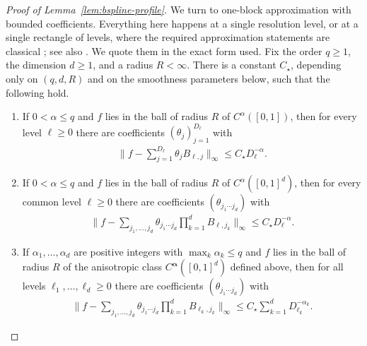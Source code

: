 \begin{proof}[Proof of Lemma~\ref{lem:bspline-profile}]
We turn to one-block approximation with bounded coefficients. Everything here happens at a single resolution level, or at a single rectangle of levels, where the required approximation statements are classical \citep[Theorem~6.10]{Schumaker2007}; see also \citet[Lemma~2 and Remark~7]{ShenGhosal2015}. We quote them in the exact form used. Fix the order $q\geq1$, the dimension $d\geq1$, and a radius $R<\infty$. There is a constant $C_\star$, depending only on $(q,d,R)$ and on the smoothness parameters below, such that the following hold.
\begin{enumerate}
\item If $0<\alpha\leq q$ and $f$ lies in the ball of radius $R$ of $C^\alpha([0,1])$, then for every level $\ell\geq0$ there are coefficients $(\theta_j)_{j=1}^{D_\ell}$ with
\begin{align*}
\Big\|f-\sum_{j=1}^{D_\ell}\theta_jB_{\ell,j}\Big\|_\infty\leq C_\star D_\ell^{-\alpha}.
\end{align*}
\item If $0<\alpha\leq q$ and $f$ lies in the ball of radius $R$ of $C^\alpha([0,1]^d)$, then for every common level $\ell\geq0$ there are coefficients $(\theta_{j_1\cdots j_d})$ with
\begin{align*}
\Big\|f-\sum_{j_1,\ldots,j_d}\theta_{j_1\cdots j_d}\prod_{k=1}^dB_{\ell,j_k}\Big\|_\infty\leq C_\star D_\ell^{-\alpha}.
\end{align*}
\item If $\alpha_1,\ldots,\alpha_d$ are positive integers with $\max_k\alpha_k\leq q$ and $f$ lies in the ball of radius $R$ of the anisotropic class $C^{\boldsymbol\alpha}([0,1]^d)$ defined above, then for all levels $\ell_1,\ldots,\ell_d\geq0$ there are coefficients $(\theta_{j_1\cdots j_d})$ with
\begin{align*}
\Big\|f-\sum_{j_1,\ldots,j_d}\theta_{j_1\cdots j_d}\prod_{k=1}^dB_{\ell_k,j_k}\Big\|_\infty\leq C_\star\sum_{k=1}^dD_{\ell_k}^{-\alpha_k}.
\end{align*}
\end{enumerate}


\end{proof}
